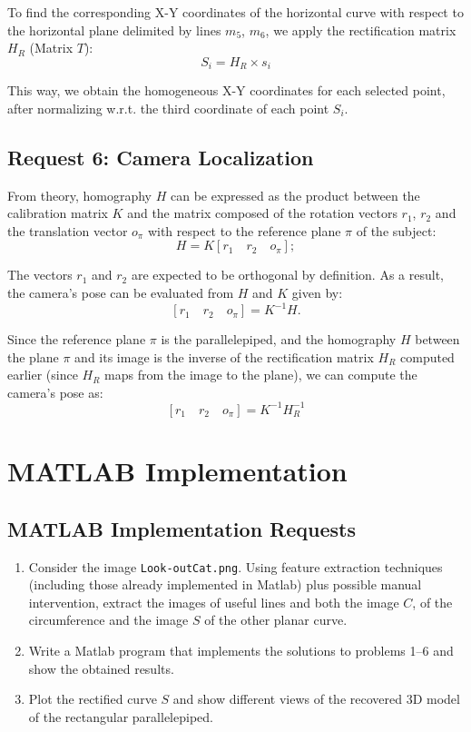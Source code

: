 \documentclass{Configuration_Files/PoliMi3i_thesis}
\begin{document}
\noindent
To find the corresponding X-Y coordinates of the horizontal curve with respect to the horizontal plane delimited by lines \(m_{5}\), \(m_{6}\), we apply the rectification matrix \(H_{R}\) (Matrix $T$):
\[
S_{i} = H_{R} \times s_{i}  
\]

\noindent
This way, we obtain the homogeneous X-Y coordinates for each selected point, after normalizing w.r.t. the third coordinate of each point \(S_{i}\).

\newpage
\section{Request 6: Camera Localization}

\noindent
From theory, homography \(H\) can be expressed as the product between the calibration matrix \(K\) and the matrix composed of the rotation vectors \(r_{1}\), \(r_{2}\) and the translation vector \(o_{\pi}\) with respect to the reference plane \(\pi\) of the subject:
\[
H = K \left[ r_{1} \quad r_{2} \quad o_{\pi} \right];
\]

\noindent
The vectors \(r_{1}\) and \(r_{2}\) are expected to be orthogonal by definition.
As a result, the camera's pose can be evaluated from \(H\) and \(K\) given by:
\[
\left[ r_{1} \quad r_{2} \quad o_{\pi} \right] = K^{-1} H.
\]

\noindent
Since the reference plane \(\pi\) is the parallelepiped, and the homography \(H\) between the plane \(\pi\) and its image is the inverse of the rectification matrix \(H_{R}\) computed earlier (since \(H_{R}\) maps from the image to the plane), we can compute the camera's pose as:
\[
\left[ r_{1} \quad r_{2} \quad o_{\pi} \right] = K^{-1} H_{R}^{-1}  
\]



\newpage
\chapter{MATLAB Implementation}

\section*{MATLAB Implementation Requests}
\begin{enumerate}
    \item Consider the image \texttt{Look-outCat.png}. Using feature extraction techniques (including those already implemented in Matlab) plus possible manual intervention, extract the images of useful lines and both the image \( C \), of the circumference and the image \( S \) of the other planar curve.
    \item Write a Matlab program that implements the solutions to problems 1–6 and show the obtained results.
    \item Plot the rectified curve \( S \) and show different views of the recovered 3D model of the rectangular parallelepiped.
\end{enumerate}
\end{document}
